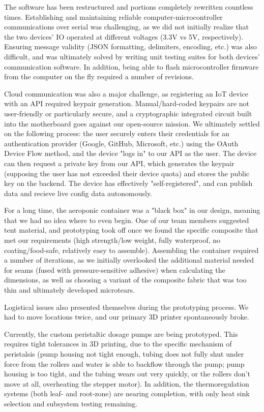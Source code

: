 \documentclass{../tex/report}
\begin{document}
The software has been restructured and portions completely rewritten countless times. Establishing and maintaining reliable computer-microcontroller communications over serial was challenging, as we did not initially realize that the two devices' IO operated at different voltages (3.3V vs 5V, respectively). Ensuring message validity (JSON formatting, delimiters, encoding, etc.) was also difficult, and was ultimately solved by writing unit testing suites for both devices' communication software. In addition, being able to flash microcontroller firmware from the computer on the fly required a number of revisions. 

Cloud communication was also a major challenge, as registering an IoT device with an API required keypair generation. Manual/hard-coded keypairs are not user-friendly or particularly secure, and a cryptographic integrated circuit built into the motherboard goes against our open-source mission. We ultimately settled on the following process: the user securely enters their credentials for an authentication provider (Google, GitHub, Microsoft, etc.) using the OAuth Device Flow method, and the device "logs in" to our API as the user. The device can then request a private key from our API, which generates the keypair (supposing the user has not exceeded their device quota) and stores the public key on the backend. The device has effectively "self-registered", and can publish data and recieve live config data autonomously.

For a long time, the aeroponic container was a "black box" in our design, meaning that we had no idea where to even begin. One of our team members suggested tent material, and prototyping took off once we found the specific composite that met our requirements (high strength/low weight, fully waterproof, no coating/food-safe, relatively easy to assemble). Assembling the container required a number of iterations, as we initially overlooked the additional material needed for seams (fused with pressure-sensitive adhesive) when calculating the dimensions, as well as choosing a variant of the composite fabric that was too thin and ultimately developed microtears.

Logistical issues also presented themselves during the prototyping process. We had to move locations twice, and our primary 3D printer spontaneously broke.

Currently, the custom peristaltic dosage pumps are being prototyped. This requires tight tolerances in 3D printing, due to the specific mechanism of peristalsis (pump housing not tight enough, tubing does not fully shut under force from the rollers and water is able to backflow through the pump; pump housing is too tight, and the tubing wears out very quickly, or the rollers don't move at all, overheating the stepper motor). In addition, the thermoregulation systems (both leaf- and root-zone) are nearing completion, with only heat sink selection and subsystem testing remaining.
\end{document}
